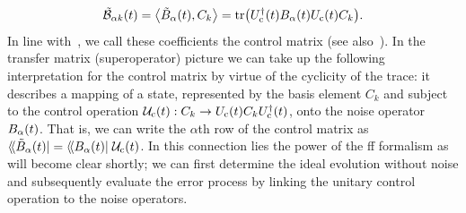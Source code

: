 \begin{equation}\label{eq:ff:control_matrix}
    \ctrlmat_{\alpha k}(t) = \dotHS{\Bat(t)}{C_k}  = \tr(\Uc\adjoint(t)\Ba(t)\Uc(t)C_k).
\end{equation}
In line with~\textcite{Green2013}, we call these coefficients the control matrix (see also~).
In the transfer matrix (superoperator) picture we can take up the following interpretation for the control matrix by virtue of the cyclicity of the trace: it describes a mapping of a state, represented by the basis element $C_k$ and subject to the control operation $\mathcal{U}_{\mathrm{c}}(t): C_k\rightarrow U_{\mathrm{c}}(t) C_kU_{\mathrm{c}}^\dagger(t)$, onto the noise operator $B_\alpha(t)$.
That is, we can write the $\alpha$th row of the control matrix as $\dbra*{\Bat(t)} = \dbra{\Ba(t)}\liouvUc(t)$.
In this connection lies the power of the \gls{ff} formalism as will become clear shortly; we can first determine the ideal evolution without noise and subsequently evaluate the error process by linking the unitary control operation to the noise operators.

